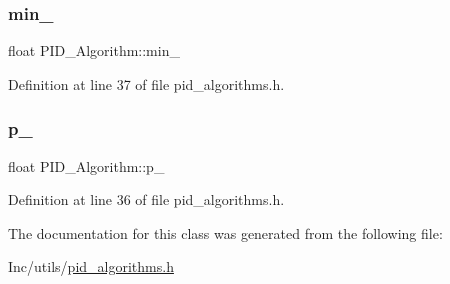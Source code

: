 \subsubsection{\texorpdfstring{min\_}{min\_}}
{\footnotesize\ttfamily float P\+I\+D\+\_\+\+Algorithm\+::min\+\_\+\hspace{0.3cm}{\ttfamily [protected]}}



Definition at line 37 of file pid\+\_\+algorithms.\+h.

\mbox{\label{class_p_i_d___algorithm_a6e988e5351fd21eb2227613ad8684d5c}} 
\subsubsection{\texorpdfstring{p\_}{p\_}}
{\footnotesize\ttfamily float P\+I\+D\+\_\+\+Algorithm\+::p\+\_\+\hspace{0.3cm}{\ttfamily [protected]}}



Definition at line 36 of file pid\+\_\+algorithms.\+h.



The documentation for this class was generated from the following file\+:\begin{DoxyCompactItemize}
\item 
Inc/utils/\mbox{\hyperlink{pid__algorithms_8h}{pid\+\_\+algorithms.\+h}}\end{DoxyCompactItemize}
